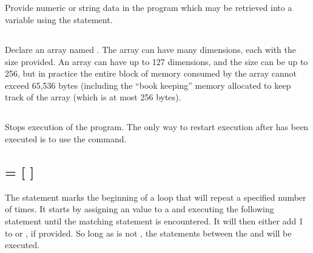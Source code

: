 \documentclass{report}
\begin{document}
    \subsection*{}

    Provide numeric or string data in the program which may be retrieved into a variable using the  statement.

    \subsection*{}

    Declare an array named .
    The array can have many dimensions, each with the size provided.
    An array can have up to 127 dimensions, and the size can be up to 256, but in practice the entire block of memory
    consumed by the array cannot exceed 65,536 bytes (including the ``book keeping'' memory allocated to keep track of the array
    (which is at most 256 bytes).

    \subsection*{}

    Stops execution of the program. The only way to restart execution after  has been
    executed is to use the  command.

    \subsection*{  =    [ ]}

    The  statement marks the beginning of a loop that will repeat a specified number of times.
    It starts by assigning an  value to a  and executing the following statement until
    the matching  statement is encountered. It will then either add 1 to  or
    , if provided. So long as  is not , the statements between the
     and  will be executed.

    \subsection*{ }
\end{document}

